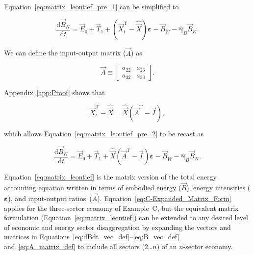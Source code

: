 \noindent{}Equation~\ref{eq:matrix_leontief_pre_1} can be simplified to

\begin{equation} \label{eq:matrix_leontief_pre_2}
	\frac{\mathrm{d}\vec{B}_{K}}{\mathrm{d}t} 
	= \vec{E}_{0}
	+ \vec{T}_{1}
	+ (\vec{X}_{t}^{\mathrm{T}} - \hat{\vec{X}})\boldsymbol{\varepsilon} 
	- \vec{B}_{\dot{W}}
	- \hat{\boldsymbol{\gamma}}_{B}\vec{B}_{K}.
\end{equation}

\noindent{}We can define the input-output matrix ($\vec{A}$) as

\begin{equation} \label{eq:A_matrix_def}
	\vec{A} 
	\equiv
	\begin{bmatrix}
		a_{22} & a_{23}	\\
		a_{32} & a_{33}	
	\end{bmatrix}.
\end{equation}

\noindent{}Appendix~\ref{app:Proof} shows that

\begin{equation} \label{eq:Xdifference1}
	\vec{X}_{t}^{\mathrm{T}} 
	- \hat{\vec{X}} 
	= \hat{\vec{X}} (\vec{A}^{\mathrm{T}} - \vec{I}),
\end{equation}

\noindent{}which allows Equation~\ref{eq:matrix_leontief_pre_2}
to be recast as

\begin{equation} \label{eq:matrix_leontief}
	\frac{\mathrm{d}\vec{B}_{K}}{\mathrm{d}t} 
	= \vec{E}_{0}
	+ \vec{T}_{1}
	+ \hat{\vec{X}} (\vec{A}^{\mathrm{T}} - \vec{I})\boldsymbol{\varepsilon} 
	- \vec{B}_{\dot{W}}
	- \hat{\boldsymbol{\gamma}}_{B}\vec{B}_{K}.
\end{equation}

\noindent{}Equation~\ref{eq:matrix_leontief} is the matrix version 
of the total energy accounting equation
written in terms of embodied energy ($\vec{B}$), 
energy intensities ($\boldsymbol{\varepsilon}$),
and input-output ratios~($\vec{A}$).
Equation~\ref{eq:C-Expanded_Matrix_Form} applies 
for the three-sector economy of Example~C, 
but the equivalent matrix formulation (Equation~\ref{eq:matrix_leontief}) 
can be extended to any desired level 
of economic and energy sector disaggregation 
by expanding the vectors and matrices in 
Equations~\ref{eq:dBdt_vec_def}--\ref{eq:B_vec_def}
and~\ref{eq:A_matrix_def} to include
all sectors (2\ldots $n$) of an $n$-sector economy.\cite{Bullard:1978vd,Casler1984}

